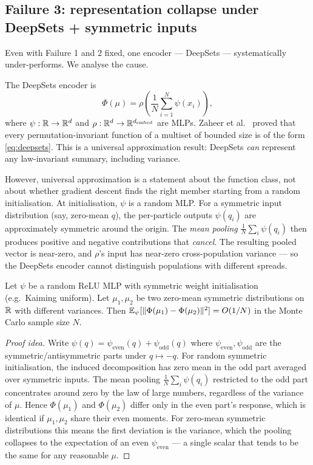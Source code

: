 \subsection{Failure 3: representation collapse under DeepSets + symmetric inputs}
\label{subsec:deepsets-collapse}

Even with Failure 1 and 2 fixed, one encoder --- DeepSets --- systematically under-performs. We analyse the cause.

The DeepSets encoder is
\begin{equation}
  \Phi(\mu) = \rho\!\left(\frac{1}{N} \sum_{i=1}^{N} \psi(x_i)\right),
  \label{eq:deepsets}
\end{equation}
where $\psi : \mathbb{R} \to \mathbb{R}^d$ and $\rho : \mathbb{R}^d \to \mathbb{R}^{d_{\text{embed}}}$ are MLPs. Zaheer et al.\ \cite{zaheer2017} proved that every permutation-invariant function of a multiset of bounded size is of the form \eqref{eq:deepsets}. This is a universal approximation result: DeepSets \emph{can} represent any law-invariant summary, including variance.

However, universal approximation is a statement about the function class, not about whether gradient descent finds the right member starting from a random initialisation. At initialisation, $\psi$ is a random MLP. For a symmetric input distribution (say, zero-mean $q$), the per-particle outputs $\psi(q_i)$ are approximately symmetric around the origin. The \emph{mean pooling} $\frac{1}{N} \sum_i \psi(q_i)$ then produces positive and negative contributions that \emph{cancel}. The resulting pooled vector is near-zero, and $\rho$'s input has near-zero cross-population variance --- so the DeepSets encoder cannot distinguish populations with different spreads.

\begin{proposition}
\label{prop:deepsets-collapse}
Let $\psi$ be a random ReLU MLP with symmetric weight initialisation (e.g.\ Kaiming uniform). Let $\mu_1, \mu_2$ be two zero-mean symmetric distributions on $\mathbb{R}$ with different variances. Then $\mathbb{E}_\psi[\|\Phi(\mu_1) - \Phi(\mu_2)\|^2] = O(1/N)$ in the Monte Carlo sample size $N$.
\end{proposition}

\begin{proof}[Proof idea]
Write $\psi(q) = \psi_{\text{even}}(q) + \psi_{\text{odd}}(q)$ where $\psi_{\text{even}}, \psi_{\text{odd}}$ are the symmetric/antisymmetric parts under $q \mapsto -q$. For random symmetric initialisation, the induced decomposition has zero mean in the odd part averaged over symmetric inputs. The mean pooling $\frac{1}{N} \sum_i \psi(q_i)$ restricted to the odd part concentrates around zero by the law of large numbers, regardless of the variance of $\mu$. Hence $\Phi(\mu_1)$ and $\Phi(\mu_2)$ differ only in the even part's response, which is identical if $\mu_1, \mu_2$ share their even moments. For zero-mean symmetric distributions this means the first deviation is the variance, which the pooling collapses to the expectation of an even $\psi_{\text{even}}$ --- a single scalar that tends to be the same for any reasonable $\mu$.
\end{proof}


